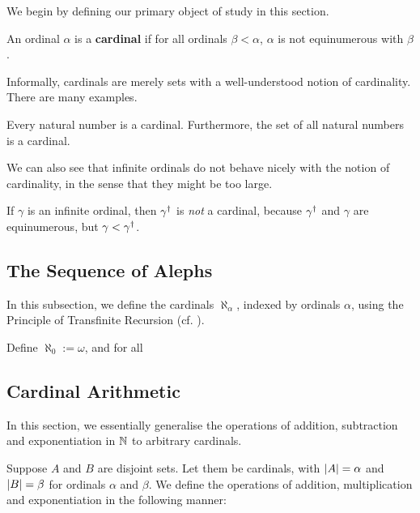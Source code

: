 We begin by defining our primary object of study in this section.

\begin{boxdefinition}[Cardinal]
    An ordinal $\alpha$ is a \textbf{cardinal} if for all ordinals $\beta < \alpha$, $\alpha$ is not equinumerous with $\beta$.
\end{boxdefinition}

Informally, cardinals are merely sets with a well-understood notion of cardinality. There are many examples.

\begin{boxexample}
    Every natural number is a cardinal. Furthermore, the set of all natural numbers is a cardinal.
\end{boxexample}

We can also see that infinite ordinals do not behave nicely with the notion of cardinality, in the sense that they might be too large.

\begin{boxnexample}
    If $\gamma$ is an infinite ordinal, then $\gamma^{\dagger}$ is \textit{not} a cardinal, because $\gamma^{\dagger}$ and $\gamma$ are equinumerous, but $\gamma < \gamma^{\dagger}$.
\end{boxnexample}

\subsection{The Sequence of Alephs}

In this subsection, we define the cardinals $\aleph_{\alpha}$, indexed by ordinals $\alpha$, using the Principle of Transfinite Recursion (cf. ).

\begin{boxdefinition}\label{Ch3:Def:Alephs}
    Define $\aleph_0 := \omega$, and for all 
    \sorry
\end{boxdefinition}

\sorry

\subsection{Cardinal Arithmetic}

In this section, we essentially generalise the operations of addition, subtraction and exponentiation in $\mathbb{N}$ to arbitrary cardinals.

\begin{boxdefinition}
    Suppose $A$ and $B$ are disjoint sets. Let them be cardinals, with $\left\lvert A \right\rvert = \alpha$ and $\left\lvert B \right\rvert = \beta$ for ordinals $\alpha$ and $\beta$. We define the operations of addition, multiplication and exponentiation in the following manner:
    \sorry
\end{boxdefinition}